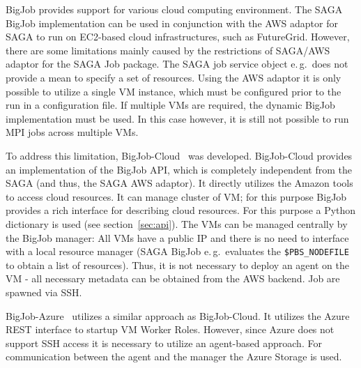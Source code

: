 \documentclass[]{article}
\begin{document}
BigJob provides support for various cloud computing environment. The SAGA BigJob
implementation can be used in conjunction with the AWS adaptor for SAGA to run
on EC2-based cloud infrastructures, such as FutureGrid. However, there are some 
limitations mainly caused by the restrictions of SAGA/AWS adaptor for the SAGA 
Job package. The SAGA job service object e.\,g.\ does not provide a mean to 
specify a set of resources. Using the AWS adaptor it is only possible to utilize 
a single VM instance, which must be configured prior to the run in a 
configuration file. If multiple VMs are required, the dynamic BigJob 
implementation must be used. In this case however, it is still not possible to 
run MPI jobs across multiple VMs. 

To address this limitation, BigJob-Cloud~\cite{saga_bigjob_condor_cloud} was
developed. BigJob-Cloud provides an implementation of the BigJob API, which is
completely independent from the SAGA (and thus, the SAGA AWS adaptor). It
directly utilizes the Amazon tools to access cloud resources. It can manage
cluster of VM; for this purpose BigJob provides a rich interface for describing
cloud resources. For this purpose a Python dictionary is used (see
section~\ref{sec:api}). The VMs can be managed centrally by the BigJob manager:
All VMs have a public IP and there is no need to interface with a local resource
manager (SAGA BigJob e.\,g.\ evaluates the \texttt{\$PBS\_NODEFILE} to obtain a
list of resources). Thus, it is not necessary to deploy an agent on the VM - all
necessary metadata can be obtained from the AWS backend. Job are spawned via
SSH.



BigJob-Azure~\cite{10.1109/CloudCom.2010.85} utilizes a similar approach as
BigJob-Cloud. It utilizes the Azure REST interface to startup VM Worker Roles.
However, since Azure does not support SSH access it is necessary to utilize an
agent-based approach. For communication between the agent and the manager the
Azure Storage is used.
\end{document}

